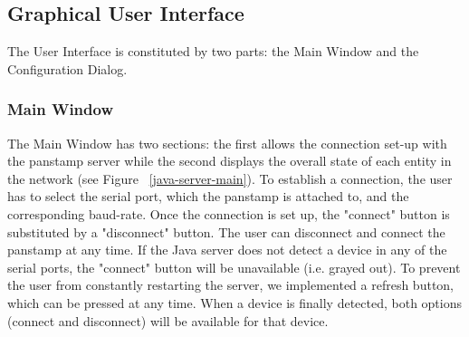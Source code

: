 \subsection{Graphical User Interface}


The User Interface is constituted by two parts: the Main Window and the Configuration Dialog.

\subsubsection{Main Window}

The Main Window has two sections: the first allows the connection set-up with the panstamp server while the second displays the overall state of each entity in the network (see Figure ~\ref{java-server-main}). 
To establish a connection, the user has to select the serial port, which the panstamp is attached to, and the corresponding baud-rate. Once the connection is set up, the "connect" button is substituted by a "disconnect" button. The user can disconnect and connect the panstamp at any time. 
If the Java server does not detect a device in any of the serial ports, the "connect" button will be unavailable (i.e. grayed out). To prevent the user from constantly restarting the server, we implemented a refresh button, which can be pressed at any time. When a device is finally detected, both options (connect and disconnect) will be available for that device.

